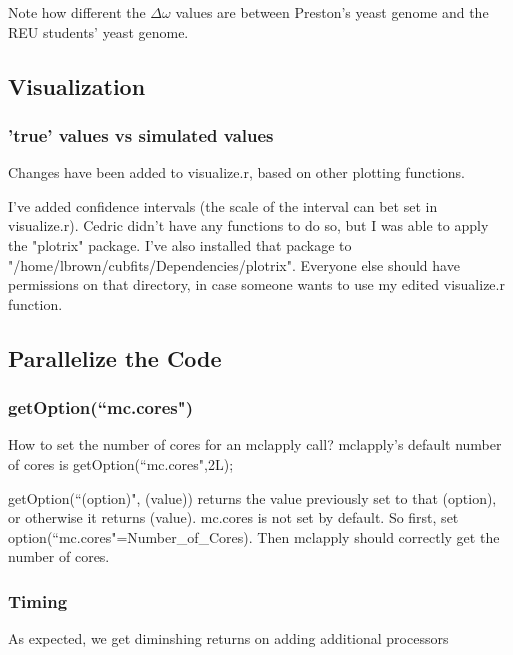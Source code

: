 Note how different the $\Delta\omega$ values are between Preston's yeast genome and the REU students' yeast genome.




\subsection{Visualization}

\subsubsection{'true' values vs simulated values}

Changes have been added to visualize.r, based on other plotting functions.

I've added confidence intervals (the scale of the interval can bet set in visualize.r). Cedric didn't have any functions to do so, but I was able to apply the "plotrix" package. I've also installed that package to "/home/lbrown/cubfits/Dependencies/plotrix". Everyone else should have permissions on that directory, in case someone wants to use my edited visualize.r function.




\subsection{Parallelize the Code}

\subsubsection{getOption(``mc.cores")}
How to set the number of cores for an mclapply call? mclapply's default number of cores is getOption(``mc.cores",2L);

getOption(``(option)", (value)) returns the value previously set to that (option), or otherwise it returns (value). mc.cores is not set by default. So first, set option(``mc.cores"=Number\_of\_Cores). Then mclapply should correctly get the number of cores.

\subsubsection{Timing}

As expected, we get diminshing returns on adding additional processors

